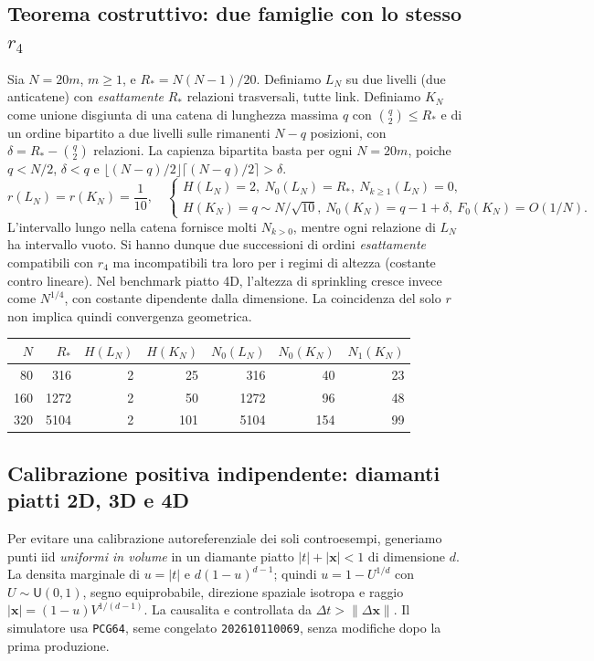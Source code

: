 \documentclass[11pt,a4paper]{article}
\begin{document}
\subsection*{Teorema costruttivo: due famiglie con lo stesso $r_4$}
Sia $N=20m$, $m\ge1$, e $R_*=N(N-1)/20$. Definiamo $L_N$ su due livelli (due anticatene) con \emph{esattamente} $R_*$ relazioni trasversali, tutte link. Definiamo $K_N$ come unione disgiunta di una catena di lunghezza massima $q$ con $\binom q2\le R_*$ e di un ordine bipartito a due livelli sulle rimanenti $N-q$ posizioni, con $\delta=R_*-\binom q2$ relazioni. La capienza bipartita basta per ogni $N=20m$, poiche $q<N/2$, $\delta<q$ e $\lfloor(N-q)/2\rfloor\lceil(N-q)/2\rceil>\delta$.
\begin{equation}
\boxed{r(L_N)=r(K_N)=\frac1{10}},\quad
\begin{cases}
H(L_N)=2,\ N_0(L_N)=R_*,\ N_{k\ge1}(L_N)=0,\\
H(K_N)=q\sim N/\sqrt{10},\ N_0(K_N)=q-1+\delta,\ F_0(K_N)=O(1/N).
\end{cases}\tag{G4.3}
\end{equation}
L'intervallo lungo nella catena fornisce molti $N_{k>0}$, mentre ogni relazione di $L_N$ ha intervallo vuoto. Si hanno dunque due successioni di ordini \emph{esattamente} compatibili con $r_4$ ma incompatibili tra loro per i regimi di altezza (costante contro lineare). Nel benchmark piatto 4D, l'altezza di sprinkling cresce invece come $N^{1/4}$, con costante dipendente dalla dimensione. La coincidenza del solo $r$ non implica quindi convergenza geometrica.

\begin{center}\small
\begin{tabular}{rrrrrrr}
\toprule
$N$ & $R_*$ & $H(L_N)$ & $H(K_N)$ & $N_0(L_N)$ & $N_0(K_N)$ & $N_1(K_N)$\\\midrule
80  & 316  & 2 & 25  & 316 & 40  & 23\\
160 & 1272 & 2 & 50  & 1272 & 96  & 48\\
320 & 5104 & 2 & 101 & 5104 & 154 & 99\\\bottomrule
\end{tabular}
\end{center}

\clearpage
\subsection*{Calibrazione positiva indipendente: diamanti piatti 2D, 3D e 4D}
Per evitare una calibrazione autoreferenziale dei soli controesempi, generiamo punti iid \emph{uniformi in volume} in un diamante piatto $|t|+|\mathbf x|<1$ di dimensione $d$. La densita marginale di $u=|t|$ e $d(1-u)^{d-1}$; quindi $u=1-U^{1/d}$ con $U\sim\mathsf U(0,1)$, segno equiprobabile, direzione spaziale isotropa e raggio $|\mathbf x|=(1-u)V^{1/(d-1)}$. La causalita e controllata da $\Delta t>\|\Delta\mathbf x\|$. Il simulatore usa \texttt{PCG64}, seme congelato \texttt{202610110069}, senza modifiche dopo la prima produzione.
\end{document}
